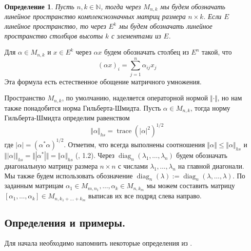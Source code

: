 \documentclass[12pt]{article}
\newtheorem{definition}[theorem]{Определение}
\begin{document}
\begin{definition}\label{DefMatrNot}
Пусть $n,k\in\mathbb{N}$, тогда через $M_{n,k}$ мы будем обозначать линейное пространство комплекснозначных матриц размера $n\times k$. Если $E$ линейное пространство, то через $E^k$ мы будем обозначать 
линейное пространство столбцов высоты $k$ с элементами из $E$.
\end{definition}

Для $\alpha\in M_{n,k}$ и $x\in E^k$ через $\alpha x$ будем обозначать столбец из $E^n$ такой, что
$$
(\alpha x)_i=\sum\limits_{j=1}^n \alpha_{ij} x_j
$$
Эта  формула есть естественное обощение матричного умножения.

Пространство $M_{n,k}$, по умолчанию, наделяется операторной нормой $\Vert\cdot\Vert$, но нам также понадобится норма Гильберта-Шмидта. Пусть $\alpha\in M_{n,k}$, тогда норму Гильберта-Шмидта определим равенством
$$
\Vert\alpha\Vert_{hs}=\operatorname{trace}(|\alpha|^2)^{1/2}
$$
где $|\alpha|=(\alpha^*\alpha)^{1/2}$. Отметим, что всегда выполнены соотношения $\Vert\alpha\Vert\leq\Vert\alpha\Vert_{hs}$ и $\Vert|\alpha|\Vert_{hs}=\Vert|\alpha^*|\Vert=\Vert\alpha\Vert_{hs}$ (\cite{EROpSp}, 1.2).
Через $\operatorname{diag}_n(\lambda_1,\ldots,\lambda_n)$ будем обозначать диагональную матрицу размера $n\times n$ с числами $\lambda_1,\ldots,\lambda_n$ на главной диагонали. Мы также будем использовать обозначение  $\operatorname{diag}_n(\lambda):=\operatorname{diag}_n(\lambda,\ldots,\lambda)$. По заданным матрицам $\alpha_1\in M_{m,n_1},\ldots,\alpha_k\in M_{n,k_m}$ мы можем составить матрицу $[\alpha_1,\ldots,\alpha_k]\in M_{n,k_1+\ldots+k_m}$ выписав их все подряд слева направо.






















\subsection{Определения и примеры.} Для начала необходимо напомнить некоторые определения из \cite{LamOpFolgen}.
\end{document}
